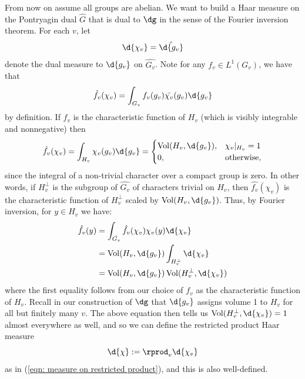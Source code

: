 \documentclass[11pt, x11names, openany]{book}
\begin{document}
From now on assume all groups are abelian. We want to build a Haar measure on the Pontryagin dual $\hat{G}$ that is dual to $\dg$ in the sense of the Fourier inversion theorem. For each $v$, let
\begin{equation*}
    \d{\chi_v} = \hat{\d{g_v}}
\end{equation*}
denote the dual measure to $\d{g_v}$ on $\hat{G_v}$. Note for any $f_v \in L^1(G_v)$, we have that
\begin{equation*}
    \hat{f_v}(\chi_v) = \int_{G_v} f_v(g_v)\bar{\chi_v}(g_v)\d{g_v}
\end{equation*}
by definition. If $f_v$ is the characteristic function of $H_v$ (which is visibly integrable and nonnegative) then 
\begin{equation*}
    \hat{f_v}(\chi_v) = \int_{H_v} \chi_v(g_v)\d{g_v} = \begin{cases}
        \vol(H_v, \d{g_v}), & \chi_v \vert_{H_v} = 1\\
        0, & \text{otherwise,}
    \end{cases}
\end{equation*}
since the integral of a non-trivial character over a compact group is zero. In other words, if $H_v^\perp$ is the subgroup of $\hat{G_v}$ of characters trivial on $H_v$, then $\hat{f_v}(\chi_v)$ is the characteristic function of $H^\perp_v$ scaled by $\vol(H_v, \d{g_v})$. Thus, by Fourier inversion, for $y \in H_v$ we have:
\begin{align*}
     \hat{f_v}(y) &= \int_{\hat{G_v}} \hat{f_v}(\chi_v) \chi_v(y) \d{\chi_v}\\ &= \vol(H_v, \d{g_v}) \int_{H^\perp_v} \d{\chi_v} \\ &= \vol(H_v, \d{g_v}) \vol(H^\perp_v, \d{\chi_v})
\end{align*}
where the first equality follows from our choice of $f_v$ as the characteristic function of $H_v$. Recall in our construction of $\dg$ that $\d{g_v}$ assigns volume 1 to $H_v$ for all but finitely many $v$. The above equation then tells us $\vol(H_v^\perp, \d{\chi_v}) = 1$ almost everywhere as well, and so we can define the restricted product Haar measure
\begin{equation}
    \label{eqn: dual measure on restricted product}
    \d{\chi} := \rprod_v \d{\chi_v}
\end{equation}
as in (\ref{eqn: measure on restricted product}), and this is also well-defined.
\end{document}
